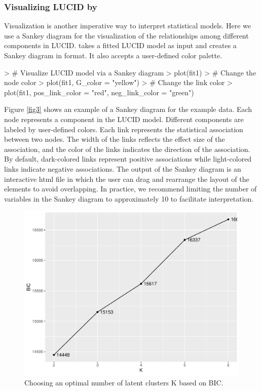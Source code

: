 \subsubsection{Visualizing LUCID by } \label{sec3.2.2}
Visualization is another imperative way to interpret statistical models. Here we use a Sankey diagram \citep{schmidt2008sankey} for the visualization of the relationships among different components in LUCID.  takes a fitted LUCID model as input and creates a Sankey diagram in  format. It also accepts a user-defined color palette. 
\begin{example}
> # Visualize LUCID model via a Sankey diagram
> plot(fit1)
> # Change the node color
> plot(fit1, G_color = "yellow")
> # Change the link color
> plot(fit1, pos_link_color = "red", neg_link_color = "green")
\end{example}
Figure \ref{fig3} shows an example of a Sankey diagram for the example data. Each node represents a component in the LUCID model. Different components are labeled by user-defined colors. Each link represents the statistical association between two nodes. The width of the links reflects the effect size of the association, and the color of the links indicates the direction of the association. By default, dark-colored links represent positive associations while light-colored links indicate negative associations. The output of the Sankey diagram is an interactive html file in which the user can drag and rearrange the layout of the elements to avoid overlapping. In practice, we recommend limiting the number of variables in the Sankey diagram to approximately 10 to facilitate interpretation.
\begin{figure}[]
    \centering
    \includegraphics[scale = 0.6]{figures/fig4.pdf}
    \caption{Choosing an optimal number of latent clusters K based on BIC.}
    \label{fig4}
\end{figure}
